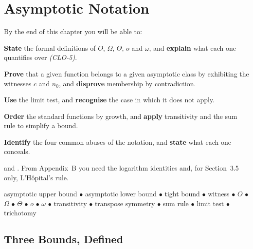 \chapter{Asymptotic Notation}\label{ch:asymptotics}

\begin{outcomes}
By the end of this chapter you will be able to:
\begin{tight}
  \item \textbf{State} the formal definitions of $O$, $\Omega$, $\Theta$, $o$
        and $\omega$, and \textbf{explain} what each one quantifies over
        \emph{(CLO-5)}.
  \item \textbf{Prove} that a given function belongs to a given asymptotic
        class by exhibiting the witnesses $c$ and $n_{0}$, and
        \textbf{disprove} membership by contradiction.
  \item \textbf{Use} the limit test, and \textbf{recognise} the case in which it
        does not apply.
  \item \textbf{Order} the standard functions by growth, and \textbf{apply}
        transitivity and the sum rule to simplify a bound.
  \item \textbf{Identify} the four common abuses of the notation, and
        \textbf{state} what each one conceals.
\end{tight}
\end{outcomes}

\begin{prereq}
 and . From Appendix~B you need the logarithm
identities and, for Section~3.5 only, L'H\^opital's rule.
\end{prereq}

\begin{keyterms}
asymptotic upper bound $\bullet$ asymptotic lower bound $\bullet$ tight bound
$\bullet$ witness $\bullet$ $O$ $\bullet$ $\Omega$ $\bullet$ $\Theta$ $\bullet$
$o$ $\bullet$ $\omega$ $\bullet$ transitivity $\bullet$ transpose symmetry
$\bullet$ sum rule $\bullet$ limit test $\bullet$ trichotomy
\end{keyterms}

\section{Three Bounds, Defined}

